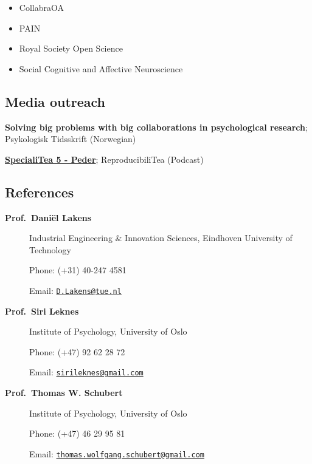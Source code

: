 \documentclass[]{article}
\providecommand{\tightlist}{%
  \setlength{\itemsep}{0pt}\setlength{\parskip}{0pt}}
\begin{document}
\begin{itemize}
\tightlist
\item
  CollabraOA
\item
  PAIN
\item
  Royal Society Open Science
\item
  Social Cognitive and Affective Neuroscience
\end{itemize}

\subsection{Media outreach}\label{media-outreach}

\begin{description}
\tightlist
\item[2018]
\textbf{Solving big problems with big collaborations in psychological
research}; Psykologisk Tidsskrift (Norwegian)\\
\item[2018]
\textbf{\href{https://soundcloud.com/reproducibilitea/specialitea-5-peder}{SpecialiTea
5 - Peder}}; ReproducibiliTea (Podcast)
\end{description}

\subsection{References}\label{references}

\begin{description}
\item[\textbf{Prof.~Daniël Lakens}]
Industrial Engineering \& Innovation Sciences, Eindhoven University of
Technology

Phone: (+31) 40-247 4581

Email: \href{mailto:D.Lakens@tue.nl}{\nolinkurl{D.Lakens@tue.nl}}
\item[\textbf{Prof.~Siri Leknes}]
Institute of Psychology, University of Oslo

Phone: (+47) 92 62 28 72

Email:
\href{mailto:sirileknes@gmail.com}{\nolinkurl{sirileknes@gmail.com}}
\item[\textbf{Prof.~Thomas W. Schubert}]
Institute of Psychology, University of Oslo

Phone: (+47) 46 29 95 81

Email:
\href{mailto:thomas.wolfgang.schubert@gmail.com}{\nolinkurl{thomas.wolfgang.schubert@gmail.com}}
\end{description}
\end{document}
